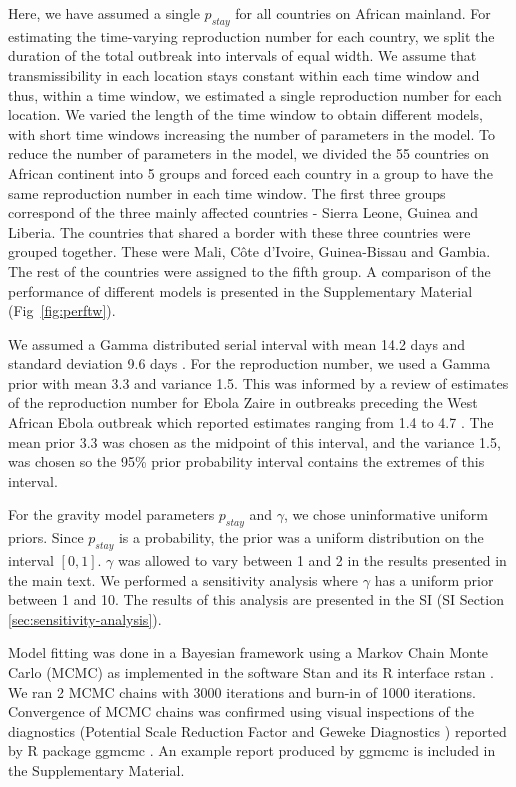 \documentclass[9pt,twocolumn,twoside,lineno]{pnas-new}
\begin{document}
{Here, we have assumed a single \(p_{stay}\) for all countries on African
mainland. For estimating the time-varying reproduction number for each
country, we split the duration of the total outbreak into intervals of
equal width. We assume that transmissibility in each location stays
constant within each time window and thus, within a time window, we
estimated a single reproduction number for each location. 
We varied the length of the time window to obtain different models, with short time
windows increasing the number of parameters in the model. 
To reduce
the number of parameters in the model, we divided the 55 countries on
African continent into 5 groups and forced each country in a
group to have the same reproduction number in each time window. 
The first three groups correspond
of the three mainly affected countries - Sierra Leone, Guinea and Liberia.
The countries that shared a border with these three countries
were grouped together. These were Mali, Côte d'Ivoire, Guinea-Bissau
and Gambia. The rest of the countries were assigned to the fifth group.
A comparison
of the performance of different models is presented in the Supplementary
Material (Fig~\ref{fig:perftw}).

We assumed a Gamma distributed serial interval with mean 14.2 days and
standard deviation 9.6 days \cite{team2015west}. For the reproduction
number, we used a Gamma prior with mean 3.3 and variance 1.5. This was
informed by a review of estimates of the reproduction number for Ebola
Zaire in outbreaks preceding the West African Ebola outbreak which
reported estimates ranging from 1.4 to 4.7 \cite{van2015review}. The
mean prior 3.3 was chosen as the midpoint of this interval, and the
variance 1.5, was chosen so the 95\% prior probability interval contains
the extremes of this interval.

For the gravity model parameters \(p_{stay}\) and \(\gamma\), we chose
uninformative uniform priors. Since \(p_{stay}\) is a probability, the
prior was a uniform distribution on the interval \([0, 1]\). 
\(\gamma\) was allowed to vary between 1 and 2 in the results presented
in the main text. We performed a sensitivity analysis where \(\gamma\)
has a uniform prior between 1 and 10. The results of this analysis are
presented in the SI (SI Section \ref{sec:sensitivity-analysis}).

Model fitting was done in a Bayesian framework using a Markov Chain
Monte Carlo (MCMC) as implemented in the software Stan
\cite{carpenter2017stan} and its R interface rstan \cite{rstan}. We ran
2 MCMC chains with 3000 iterations and burn-in of 1000 iterations.
Convergence of MCMC chains was confirmed using visual inspections of the
diagnostics (Potential Scale Reduction Factor \cite{gelman1992inference}
and Geweke Diagnostics \cite{geweke}) reported by R package ggmcmc
\cite{ggmcmc}. An example report produced by ggmcmc is included in the
Supplementary Material.

}
\end{document}
